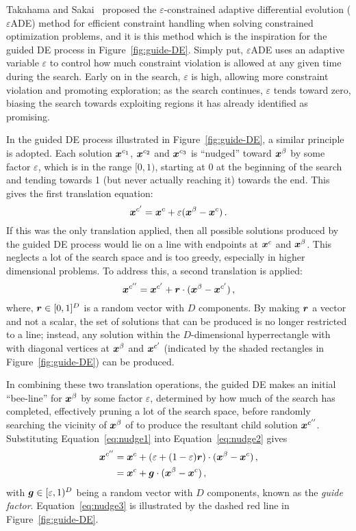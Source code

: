 Takahama and Sakai~\cite{takahama2010efficient} proposed the $\varepsilon$-constrained adaptive differential evolution ($\varepsilon$ADE) method for efficient constraint handling when solving constrained optimization problems, and it is this method which is the inspiration for the guided DE process in Figure~\ref{fig:guide-DE}. Simply put, $\varepsilon$ADE uses an adaptive variable $\varepsilon$ to control how much constraint violation is allowed at any given time during the search. Early on in the search, $\varepsilon$ is high, allowing more constraint violation and promoting exploration; as the search continues, $\varepsilon$ tends toward zero, biasing the search towards exploiting regions it has already identified as promising.

In the guided DE process illustrated in Figure~\ref{fig:guide-DE}, a similar principle is adopted. Each solution $\boldsymbol{x}^{c_1}$, $\boldsymbol{x}^{c_2}$ and $\boldsymbol{x}^{c_3}$ is ``nudged'' toward $\boldsymbol{x}^\beta$ by some factor $\varepsilon$, which is in the range $[0,1)$, starting at 0 at the beginning of the search and tending towards 1 (but never actually reaching it) towards the end. This gives the first translation equation:
\begin{equation}\label{eq:nudge1}
\boldsymbol{x}^{c'} = \boldsymbol{x}^c + \varepsilon(\boldsymbol{x}^\beta - \boldsymbol{x}^c)\,.
\end{equation}
If this was the only translation applied, then all possible solutions produced by the guided DE process would lie on a line with endpoints at $\boldsymbol{x}^{c}$ and $\boldsymbol{x}^\beta$. This neglects a lot of the search space and is too greedy, especially in higher dimensional problems. To address this, a second translation is applied:
\begin{equation}\label{eq:nudge2}
\boldsymbol{x}^{c''} = \boldsymbol{x}^{c'} + \boldsymbol{r} \cdot (\boldsymbol{x}^\beta - \boldsymbol{x}^{c'})\,,
\end{equation}
where, $\boldsymbol{r}\in [0,1]^D$ is a random vector with $D$ components. By making $\boldsymbol{r}$ a vector and not a scalar, the set of solutions that can be produced is no longer restricted to a line; instead, any solution within the $D$-dimensional hyperrectangle with with diagonal vertices at $\boldsymbol{x}^\beta$ and $\boldsymbol{x}^{c'}$ (indicated by the shaded rectangles in Figure~\ref{fig:guide-DE}) can be produced.

In combining these two translation operations, the guided DE makes an initial ``bee-line'' for $\boldsymbol{x}^\beta$ by some factor $\varepsilon$, determined by how much of the search has completed, effectively pruning a lot of the search space, before randomly searching the vicinity of $\boldsymbol{x}^\beta$ of to produce the resultant child solution $\boldsymbol{x}^{c''}$. Substituting Equation~\ref{eq:nudge1} into Equation~\ref{eq:nudge2} gives
\begin{align}\label{eq:nudge3}
\boldsymbol{x}^{c''} &= \boldsymbol{x}^{c} + (\varepsilon + (1-\varepsilon)\boldsymbol{r}) \cdot (\boldsymbol{x}^\beta - \boldsymbol{x}^{c})\,,\nonumber\\
& = \boldsymbol{x}^{c} + \boldsymbol{g} \cdot (\boldsymbol{x}^\beta - \boldsymbol{x}^{c})\,,
\end{align}
with $\boldsymbol{g} \in [\varepsilon,1)^D$ being a random vector with $D$ components, known as the \emph{guide factor}. Equation~\ref{eq:nudge3} is illustrated by the dashed red line in Figure~\ref{fig:guide-DE}.

